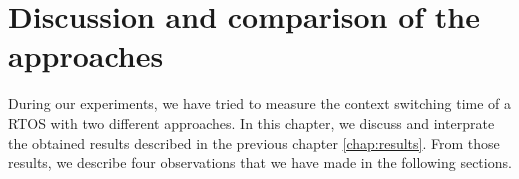 \chapter{Discussion and comparison of the approaches}

During our experiments, we have tried to measure the context switching time of a RTOS with two different approaches.
In this chapter, we discuss and interprate the obtained results described in the previous chapter \ref{chap:results}.
From those results, we describe four observations that we have made in the following sections.





